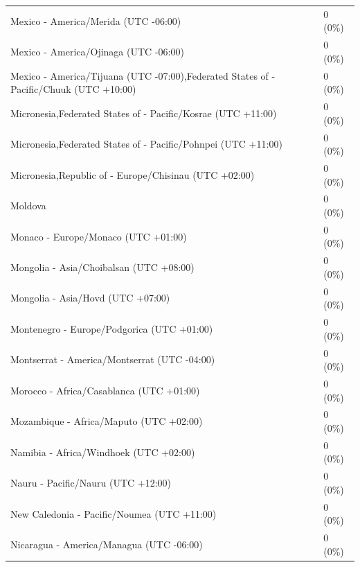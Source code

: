 \documentclass[
  english,
  man]{apa6}
\begin{document}
\begin{appendix}
\begin{table}
{\begin{tabular}[t]{ll}
\hspace{1em}Mexico - America/Merida (UTC -06:00) & 0 (0\%)\\
\hspace{1em}Mexico - America/Ojinaga (UTC -06:00) & 0 (0\%)\\
\hspace{1em}Mexico - America/Tijuana (UTC -07:00),Federated States of - Pacific/Chuuk (UTC +10:00) & 0 (0\%)\\
\addlinespace
\hspace{1em}Micronesia,Federated States of - Pacific/Kosrae (UTC +11:00) & 0 (0\%)\\
\hspace{1em}Micronesia,Federated States of - Pacific/Pohnpei (UTC +11:00) & 0 (0\%)\\
\hspace{1em}Micronesia,Republic of - Europe/Chisinau (UTC +02:00) & 0 (0\%)\\
\hspace{1em}Moldova & 0 (0\%)\\
\hspace{1em}Monaco - Europe/Monaco (UTC +01:00) & 0 (0\%)\\
\addlinespace
\hspace{1em}Mongolia - Asia/Choibalsan (UTC +08:00) & 0 (0\%)\\
\hspace{1em}Mongolia - Asia/Hovd (UTC +07:00) & 0 (0\%)\\
\hspace{1em}Montenegro - Europe/Podgorica (UTC +01:00) & 0 (0\%)\\
\hspace{1em}Montserrat - America/Montserrat (UTC -04:00) & 0 (0\%)\\
\hspace{1em}Morocco - Africa/Casablanca (UTC +01:00) & 0 (0\%)\\
\addlinespace
\hspace{1em}Mozambique - Africa/Maputo (UTC +02:00) & 0 (0\%)\\
\hspace{1em}Namibia - Africa/Windhoek (UTC +02:00) & 0 (0\%)\\
\hspace{1em}Nauru - Pacific/Nauru (UTC +12:00) & 0 (0\%)\\
\hspace{1em}New Caledonia - Pacific/Noumea (UTC +11:00) & 0 (0\%)\\
\hspace{1em}Nicaragua - America/Managua (UTC -06:00) & 0 (0\%)\\

\end{tabular}}
\end{table}
\end{appendix}
\end{document}
